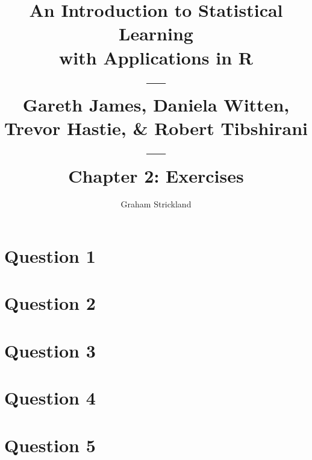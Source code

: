 \documentclass{article}
\title{
    An Introduction to Statistical Learning\\with Applications in R\\---\\
    Gareth James, Daniela Witten, Trevor Hastie, \& Robert Tibshirani\\---\\
    Chapter 2: Exercises
}
\author{Graham Strickland}
\begin{document}
\maketitle  

\section*{Question 1}


\section*{Question 2}


\section*{Question 3}


\section*{Question 4}


\section*{Question 5}

\end{document}
